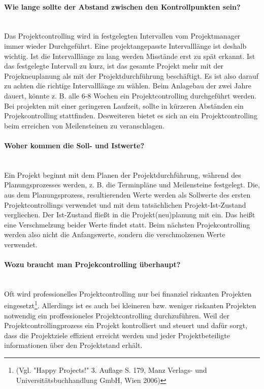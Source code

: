 \documentclass[10pt,a4paper,oneside]{article}
\begin{document}
\paragraph{ Wie lange sollte der Abstand zwischen den Kontrollpunkten sein? } ~\\

Das Projektcontrolling wird in festgelegten Intervallen vom Projektmanager immer wieder Durchgeführt. Eine projektangepasste Intervalllänge ist deshalb wichtig. Ist die Intervalllänge zu lang werden Misstände erst zu spät erkannt.
Ist das festgelegte Intervall zu kurz, ist das gesamte Projekt mehr mit der Projekneuplanung als mit der Projektdurchführung beschäftigt. Es ist also darauf zu achten die richtige Intervalllänge zu wählen. 
Beim Anlagebau der zwei Jahre dauert, könnte z. B. alle 6-8 Wochen ein Projektcontrolling durchgeführt werden. Bei projekten mit einer geringeren Laufzeit, sollte in kürzeren Abständen ein Projekcontrolling
stattfinden.
Desweiteren bietet es sich an ein Projektcontrolling beim erreichen von Meilensteinen zu veranschlagen.

\paragraph{ Woher kommen die Soll- und Istwerte? } ~\\

Ein Projekt beginnt mit dem Planen der Projektdurchführung, während des Planungsprozesses werden, z. B. die Terminpläne und Meilensteine festgelegt. Die, aus dem Planungsprozess, resultierenden Werte werden als Sollwerte des ersten Projektcontrollings verwendet und mit dem tatsächlichen Projekt-Ist-Zustand vergliechen. Der Ist-Zustand fließt in die Projekt(neu)planung mit ein. Das heißt eine Verschmelzung beider Werte findet statt. Beim nächsten Projekcontrolling werden also nicht die Anfangswerte, sondern die verschmolzenen Werte verwendet.

\paragraph{ Wozu braucht man Projekcontrolling überhaupt? } ~\\

Oft wird professionelles Projektcontrolling nur bei finanziel riskanten Projekten eingesetzt\footnote{(Vgl. "Happy Projects!" 3. Auflage S. 179, Manz Verlags- und Universitätsbuchhandlung GmbH, Wien 2006)}. Allerdings ist es auch bei kleineren bzw. weniger riskanten Projekten notwendig ein proffessioneles Projektcontrolling durchzuführen. Weil der Projektcontrollingprozess ein Projekt kontrolliert und steuert und dafür sorgt, dass die Projektziele effizient erreicht werden und jeder Projektbeteiligte 
informationen über den Projektstand erhält.
\end{document}
